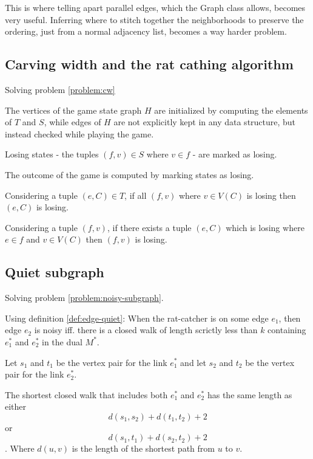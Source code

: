 \documentclass{article}
\begin{document}
		This is where telling apart parallel edges, which the Graph class allows, becomes very useful. Inferring where to stitch together the neighborhoods to preserve the ordering, just from a normal adjacency list, becomes a way harder problem.


	\subsection{Carving width and the rat cathing algorithm}\label{impl:cw}

		Solving problem \ref{problem:cw}

		The vertices of the game state graph $H$ are initialized by computing the elements of $T$ and $S$, while edges of $H$ are not explicitly kept in any data structure, but instead checked while playing the game.

		Losing states - the tuples $(f,v) \in S$ where $v \in f$ - are marked as losing.

		The outcome of the game is computed by marking states as losing.
		
		Considering a tuple $(e, C) \in T$, if all $(f, v)$ where $v \in V(C)$ is losing then $(e, C)$ is losing.

		Considering a tuple $(f, v)$, if there exists a tuple $(e, C)$ which is losing where $e \in f$ and $v \in V(C)$ then $(f, v)$ is losing.


	\subsection{Quiet subgraph}\label{impl:quiet}

		Solving problem \ref{problem:noisy-subgraph}.

		Using definition \ref{def:edge-quiet}: When the rat-catcher is on some edge $e_1$, then edge $e_2$ is noisy iff. there is a closed walk of length scrictly less than $k$ containing $e_1^*$ and $e_2^*$ in the dual $M^*$.

		Let $s_1$ and $t_1$ be the vertex pair for the link $e_1^*$ and let $s_2$ and $t_2$ be the vertex pair for the link $e_2^*$.

		\begin{claim}
			The shortest closed walk that includes both $e_1^*$ and $e_2^*$ has the same length as either $$d(s_1, s_2) + d(t_1, t_2) + 2$$ or $$d(s_1, t_1) + d(s_2, t_2) + 2$$. Where $d(u, v)$ is the length of the shortest path from $u$ to $v$.
		\end{claim}
\end{document}
